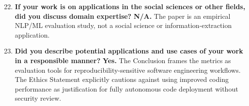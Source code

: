 \documentclass[11pt,a4paper]{article}
\begin{document}
\begin{enumerate}
\setcounter{enumi}{21}

\item \textbf{If your work is on applications in the social sciences or
  other fields, did you discuss domain expertise?}
  \textbf{N/A.} The paper is an empirical NLP/ML evaluation study, not
  a social science or information-extraction application.

\item \textbf{Did you describe potential applications and use cases of
  your work in a responsible manner?}
  \textbf{Yes.} The Conclusion frames the metrics as evaluation tools
  for reproducibility-sensitive software engineering workflows. The
  Ethics Statement explicitly cautions against using improved coding
  performance as justification for fully autonomous code deployment
  without security review.

\end{enumerate}
\end{document}
